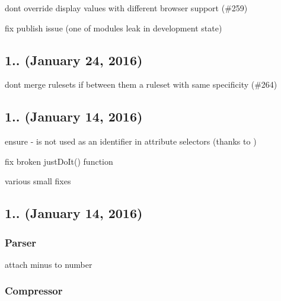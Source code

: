 \begin{DoxyItemize}
\item don\textquotesingle{}t override display values with different browser support (\#259)
\item fix publish issue (one of modules leak in development state)
\end{DoxyItemize}

\subsection*{1.. (January 24, 2016)}


\begin{DoxyItemize}
\item don\textquotesingle{}t merge rulesets if between them a ruleset with same specificity (\#264)
\end{DoxyItemize}

\subsection*{1.. (January 14, 2016)}


\begin{DoxyItemize}
\item ensure {\ttfamily -\/} is not used as an identifier in attribute selectors (thanks to )
\item fix broken {\ttfamily just\+Do\+It()} function
\item various small fixes
\end{DoxyItemize}

\subsection*{1.. (January 14, 2016)}

\subsubsection*{Parser}


\begin{DoxyItemize}
\item attach minus to number
\end{DoxyItemize}

\subsubsection*{Compressor}



